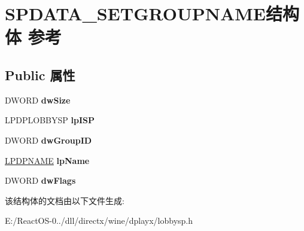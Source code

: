 \hypertarget{struct_s_p_d_a_t_a___s_e_t_g_r_o_u_p_n_a_m_e}{}\section{S\+P\+D\+A\+T\+A\+\_\+\+S\+E\+T\+G\+R\+O\+U\+P\+N\+A\+M\+E结构体 参考}
\label{struct_s_p_d_a_t_a___s_e_t_g_r_o_u_p_n_a_m_e}
\subsection*{Public 属性}
\begin{DoxyCompactItemize}
\item 
\mbox{\label{struct_s_p_d_a_t_a___s_e_t_g_r_o_u_p_n_a_m_e_a90bc703901ada9a95943298982e43276}} 
D\+W\+O\+RD {\bfseries dw\+Size}
\item 
\mbox{\label{struct_s_p_d_a_t_a___s_e_t_g_r_o_u_p_n_a_m_e_ac7f98caa77e0fca813a1321a3d29c1f5}} 
L\+P\+D\+P\+L\+O\+B\+B\+Y\+SP {\bfseries lp\+I\+SP}
\item 
\mbox{\label{struct_s_p_d_a_t_a___s_e_t_g_r_o_u_p_n_a_m_e_a74ccb4aa0deac72f47baf5c6d0390407}} 
D\+W\+O\+RD {\bfseries dw\+Group\+ID}
\item 
\mbox{\label{struct_s_p_d_a_t_a___s_e_t_g_r_o_u_p_n_a_m_e_a62ad137fb74f75611cadfac021ac7c0d}} 
\hyperlink{structtag_d_p_n_a_m_e}{L\+P\+D\+P\+N\+A\+ME} {\bfseries lp\+Name}
\item 
\mbox{\label{struct_s_p_d_a_t_a___s_e_t_g_r_o_u_p_n_a_m_e_a875014f81889001abaae11dd6dac31dd}} 
D\+W\+O\+RD {\bfseries dw\+Flags}
\end{DoxyCompactItemize}


该结构体的文档由以下文件生成\+:\begin{DoxyCompactItemize}
\item 
E\+:/\+React\+O\+S-\/0../dll/directx/wine/dplayx/lobbysp.\+h\end{DoxyCompactItemize}

